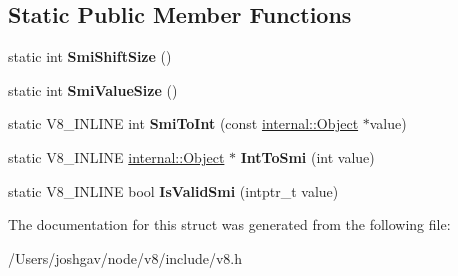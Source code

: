 \subsection*{Static Public Member Functions}
\begin{DoxyCompactItemize}
\item 
static int {\bfseries Smi\+Shift\+Size} ()\hypertarget{structv8_1_1internal_1_1_smi_tagging_3_018_01_4_a4fb28f586fdee8316a03f9b8f94b945d}{}\label{structv8_1_1internal_1_1_smi_tagging_3_018_01_4_a4fb28f586fdee8316a03f9b8f94b945d}

\item 
static int {\bfseries Smi\+Value\+Size} ()\hypertarget{structv8_1_1internal_1_1_smi_tagging_3_018_01_4_a836e783af92beb7ca9cc8cdabef43ab2}{}\label{structv8_1_1internal_1_1_smi_tagging_3_018_01_4_a836e783af92beb7ca9cc8cdabef43ab2}

\item 
static V8\+\_\+\+I\+N\+L\+I\+NE int {\bfseries Smi\+To\+Int} (const \hyperlink{classv8_1_1internal_1_1_object}{internal\+::\+Object} $\ast$value)\hypertarget{structv8_1_1internal_1_1_smi_tagging_3_018_01_4_a040db1ceee3195c2463075b7b50cfda0}{}\label{structv8_1_1internal_1_1_smi_tagging_3_018_01_4_a040db1ceee3195c2463075b7b50cfda0}

\item 
static V8\+\_\+\+I\+N\+L\+I\+NE \hyperlink{classv8_1_1internal_1_1_object}{internal\+::\+Object} $\ast$ {\bfseries Int\+To\+Smi} (int value)\hypertarget{structv8_1_1internal_1_1_smi_tagging_3_018_01_4_a1926f38e35fc98fe244e8136180d70f2}{}\label{structv8_1_1internal_1_1_smi_tagging_3_018_01_4_a1926f38e35fc98fe244e8136180d70f2}

\item 
static V8\+\_\+\+I\+N\+L\+I\+NE bool {\bfseries Is\+Valid\+Smi} (intptr\+\_\+t value)\hypertarget{structv8_1_1internal_1_1_smi_tagging_3_018_01_4_a5ab93d4cf7c3b9ceff5116b3598a1f94}{}\label{structv8_1_1internal_1_1_smi_tagging_3_018_01_4_a5ab93d4cf7c3b9ceff5116b3598a1f94}

\end{DoxyCompactItemize}


The documentation for this struct was generated from the following file\+:\begin{DoxyCompactItemize}
\item 
/\+Users/joshgav/node/v8/include/v8.\+h\end{DoxyCompactItemize}
